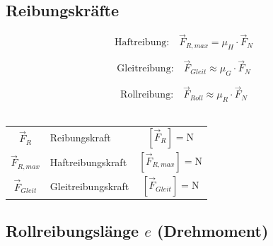 	
	\vfill\null
	\columnbreak	
	
	
	\subsection{Reibungskräfte}
	

	$$ \boxed{ \text{Haftreibung:} \quad  \vec{F}_{R,max} = \mu_H \cdot \vec{F}_N } $$ 
	
	$$ \boxed{ \text{Gleitreibung:} \quad \vec{F}_{Gleit} \approx \mu_G \cdot \vec{F}_N } $$ 
	
	$$ \boxed{ \text{Rollreibung:} \quad \vec{F}_{Roll} \approx \mu_R \cdot \vec{F}_N } $$ \\

	
		
	\begin{tabular}{c l c}
	$\vec{F}_R$ & Reibungskraft & $[\vec{F}_R] = \mathrm{N}$ \\
	$\vec{F}_{R,max}$ & Haftreibungskraft & $[\vec{F}_{R,max}] = \mathrm{N}$ \\
	$\vec{F}_{Gleit}$ & Gleitreibungskraft & $[\vec{F}_{Gleit}] = \mathrm{N}$ \\
	\end{tabular}
	
	
	\subsection{Rollreibungslänge $e$ (Drehmoment)}

